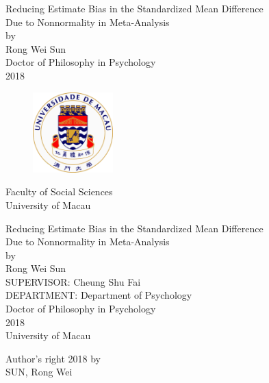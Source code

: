 \documentclass[a4paper, 12pt, twoside]{article}
\begin{document}
\begin{titlepage}
	\begin{center}
	\doublespacing
	Reducing Estimate Bias in the Standardized Mean Difference \\
	Due to Nonnormality in Meta-Analysis \\
	[1.5cm]
	by\\
	[1.5cm]
	Rong Wei Sun\\
	[2.4cm]
	Doctor of Philosophy in Psychology\\
	[5cm]
	2018\\
		\begin{figure}[h]
			\centering
			\includegraphics[width = 31mm]{fig/umac_logo}
		\end{figure}
	Faculty of Social Sciences\\
	University of Macau
	\end{center}
\end{titlepage}
\begin{titlepage}
	\begin{center}
	\doublespacing
	Reducing Estimate Bias in the Standardized Mean Difference \\
	Due to Nonnormality in Meta-Analysis \\
	[1.5cm]
	by\\
	[1.5cm]
	Rong Wei Sun\\
	[1.5cm]
	SUPERVISOR: Cheung Shu Fai\\
	[1.5cm]
	DEPARTMENT: Department of Psychology\\
	[1.5cm]
	Doctor of Philosophy in Psychology\\
	[1.5cm]
	2018\\
	[1.5cm]
	University of Macau
	\end{center}
\end{titlepage}
\begin{titlepage}
\begin{center}
Author's right 2018 by\\
SUN, Rong Wei
\end{center}
\end{titlepage}
\end{document}
